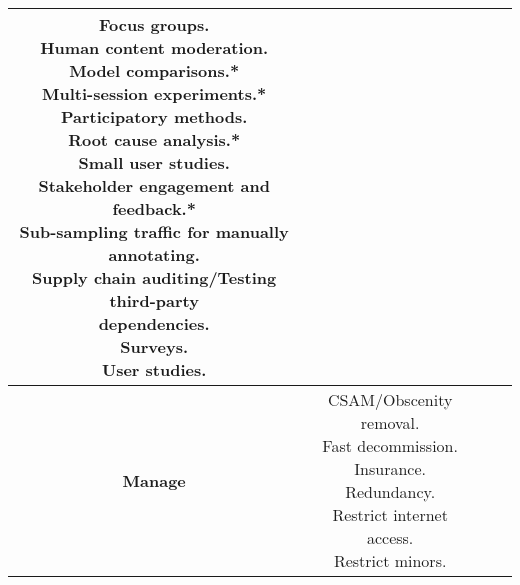 \documentclass[fleqn]{article}
\begin{document}
\begin{landscape}
\begin{table}[H]
\begin{tabular}{|c|c|c|c|}
{			\textbullet\hspace{3pt} Focus groups. \\
			\textbullet\hspace{3pt} Human content moderation. \\
			\textbullet\hspace{3pt} Model comparisons.* \\
			\textbullet\hspace{3pt} Multi-session experiments.* \\
			\textbullet\hspace{3pt} Participatory methods. \\			
			\textbullet\hspace{3pt} Root cause analysis.* \\			
			\textbullet\hspace{3pt} Small user studies. \\			
			\textbullet\hspace{3pt} Stakeholder engagement and feedback.* \\
			\textbullet\hspace{3pt} Sub-sampling traffic for manually annotating. \\
			\textbullet\hspace{3pt} Supply chain auditing/Testing third-party \\\hspace{10pt}dependencies. \\			
			\textbullet\hspace{3pt} Surveys. \\					
			\textbullet\hspace{3pt} User studies. \\
		}
		\\
		\hline		
		\textbf{Manage} & \makecell[l]{	
			\textbullet\hspace{3pt} CSAM/Obscenity removal. \\ 	
			\textbullet\hspace{3pt} Fast decommission. \\ 	
			\textbullet\hspace{3pt} Insurance. \\ 	
			\textbullet\hspace{3pt} Redundancy. \\ 	
			\textbullet\hspace{3pt} Restrict internet access. \\ 	
			\textbullet\hspace{3pt} Restrict minors. \\ 	
}
\end{tabular}
\end{table}
\end{landscape}
\end{document}

